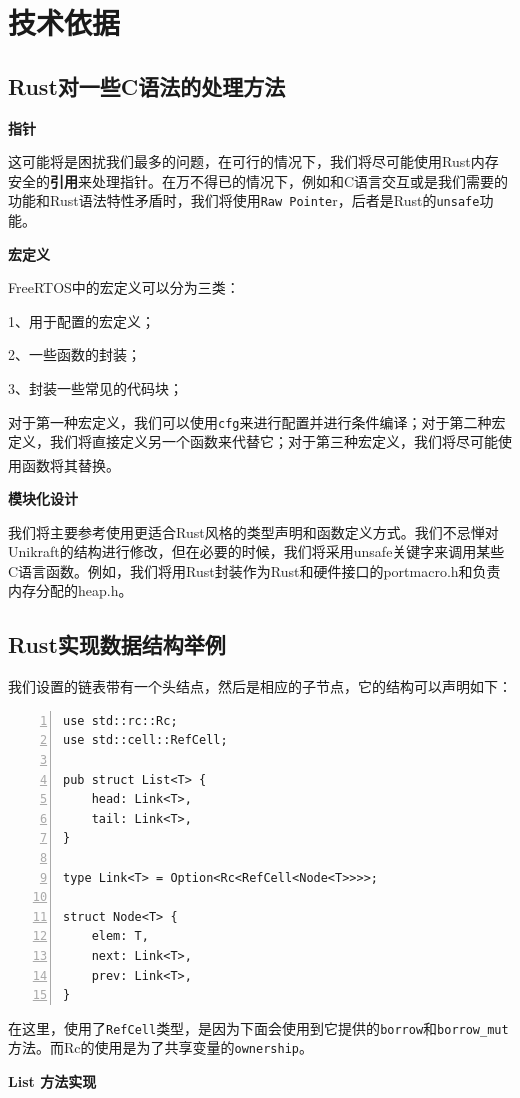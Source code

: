 \documentclass[UTF8,fontset=none,linespread=1.15]{ctexart}
\let\nosupcite\cite
\renewcommand*{\cite}[1]{\textsuperscript{\nosupcite{#1}}}
\begin{document}
\section{技术依据}

\subsection{Rust对一些C语法的处理方法}
\textbf{指针}

这可能将是困扰我们最多的问题，在可行的情况下，我们将尽可能使用Rust内存安全的\textbf{引用}来处理指针。在万不得已的情况下，例如和C语言交互或是我们需要的功能和Rust语法特性矛盾时，我们将使用\texttt{Raw Pointe}r，后者是Rust的\texttt{unsafe}功能。

\textbf{宏定义}

FreeRTOS中的宏定义可以分为三类：

1、用于配置的宏定义；

2、一些函数的封装；

3、封装一些常见的代码块；

对于第一种宏定义，我们可以使用\texttt{cfg}来进行配置并进行条件编译；对于第二种宏定义，我们将直接定义另一个函数来代替它；对于第三种宏定义，我们将尽可能使用函数将其替换。\cite{e}

\textbf{模块化设计}

我们将主要参考使用更适合Rust风格的类型声明和函数定义方式。我们不忌惮对Unikraft的结构进行修改，但在必要的时候，我们将采用unsafe关键字来调用某些C语言函数。例如，我们将用Rust封装作为Rust和硬件接口的portmacro.h和负责内存分配的heap.h。
\subsection{Rust实现数据结构举例}
我们设置的链表带有一个头结点，然后是相应的子节点，它的结构可以声明如下：
\begin{lstlisting}[numbers=left]
use std::rc::Rc;
use std::cell::RefCell;

pub struct List<T> {
	head: Link<T>,
	tail: Link<T>,
}

type Link<T> = Option<Rc<RefCell<Node<T>>>>;

struct Node<T> {
	elem: T,
	next: Link<T>,
	prev: Link<T>,
}
\end{lstlisting}
在这里，使用了\texttt{RefCell}类型，是因为下面会使用到它提供的\texttt{borrow}和\texttt{borrow\_mut}方法。而Rc的使用是为了共享变量的\texttt{ownership}。

\textbf{List 方法实现}
\end{document}
